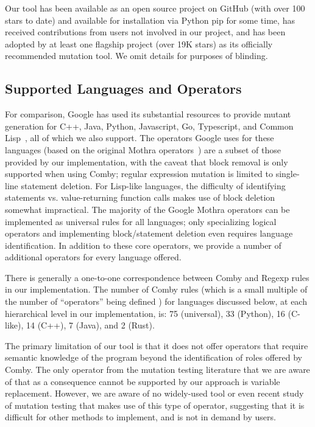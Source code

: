 \documentclass[acmsmall,screen,review,anonymous]{acmart}
\begin{document}
{Our tool has been available as an open source project on GitHub (with
over 100 stars to date) and
available for installation via Python pip for
some time, has received contributions from users not involved in
our project, and has been adopted by at least one flagship project
(over 19K stars) as
its officially recommended mutation tool.  We omit details for
purposes of blinding.

\subsection{Supported Languages and Operators}

For comparison, Google has used its substantial resources to provide mutant generation for C++, Java,
Python, Javascript, Go, Typescript, and Common
Lisp~\cite{PetrovicMutationGoogle}, all of which we also support.  The
operators Google uses for these
languages (based on the original Mothra operators~\cite{offutt1996experimental}) are a subset of those provided by our implementation, with the caveat
that block removal is only supported when using Comby;
regular expression mutation is limited to single-line statement
deletion.  For Lisp-like languages, the difficulty of identifying statements vs. value-returning
function calls makes use of block deletion somewhat impractical.  The majority of the Google Mothra operators
can be implemented as universal rules for all languages; only specializing
logical operators and implementing block/statement deletion even requires
language identification.  In addition to these core operators, we
provide a number of additional operators for every language offered.

There is generally a one-to-one
correspondence between Comby and Regexp rules in our implementation.
The number of Comby rules (which is a small multiple of the number of
``operators'' being defined ) for languages discussed below, at each hierarchical level in our
implementation, is:  75 (universal), 33 (Python), 16 (C-like), 14
(C++), 7 (Java), and 2 (Rust).

The primary limitation of our tool is that it does not offer operators
that require semantic knowledge of the program beyond the
identification of roles offered by Comby.
The only operator from the mutation testing literature that we are aware of that
as a consequence cannot be supported by our approach is variable
replacement.  However, we are aware of no widely-used tool or even recent
study of mutation testing that makes use of this type of operator,
suggesting that it is difficult for other methods to implement, and is
not in demand by users.

}
\end{document}
